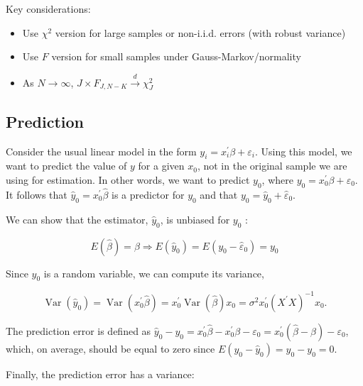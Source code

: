 Key considerations:
\begin{itemize}
    \item Use $\chi^{2}$ version for large samples or non-i.i.d. errors (with robust variance)
    \item Use $F$ version for small samples under Gauss-Markov/normality
    \item As $N \to \infty$, $J \times F_{J,N-K} \stackrel{d}{\to} \chi_{J}^{2}$
\end{itemize}

\subsection{Prediction}
Consider the usual linear model in the form $y_{i}=x_{i}^{\prime} \beta+\varepsilon_{i}$. Using this model, we want to predict the value of $y$ for a given $x_{0}$, not in the original sample we are\\
using for estimation. In other words, we want to predict $y_{0}$, where $y_{0}=x_{0}^{\prime} \beta+\varepsilon_{0}$. It follows that $\widehat{y}_{0}=x_{0}^{\prime} \widehat{\beta}$ is a predictor for $y_{0}$ and that $y_{0}=\widehat{y}_{0}+\widehat{\varepsilon}_{0}$.

We can show that the estimator, $\widehat{y}_{0}$, is unbiased for $y_{0}$ :

$$
E(\widehat{\beta})=\beta \Longrightarrow E\left(\widehat{y}_{0}\right)=E\left(y_{0}-\widehat{\varepsilon}_{0}\right)=y_{0}
$$

Since $\widehat{y}_{0}$ is a random variable, we can compute its variance,

$$
\operatorname{Var}\left(\widehat{y}_{0}\right)=\operatorname{Var}\left(x_{0}^{\prime} \widehat{\beta}\right)=x_{0}^{\prime} \operatorname{Var}(\widehat{\beta}) x_{0}=\sigma^{2} x_{0}^{\prime}\left(X^{\prime} X\right)^{-1} x_{0} .
$$

The prediction error is defined as $\widehat{y}_{0}-y_{0}=x_{0}^{\prime} \widehat{\beta}-x_{0}^{\prime} \beta-\varepsilon_{0}=x_{0}^{\prime}(\widehat{\beta}-\beta)-\varepsilon_{0}$, which, on average, should be equal to zero since $E\left(y_{0}-\widehat{y}_{0}\right)=y_{0}-y_{0}=0$.

Finally, the prediction error has a variance:

